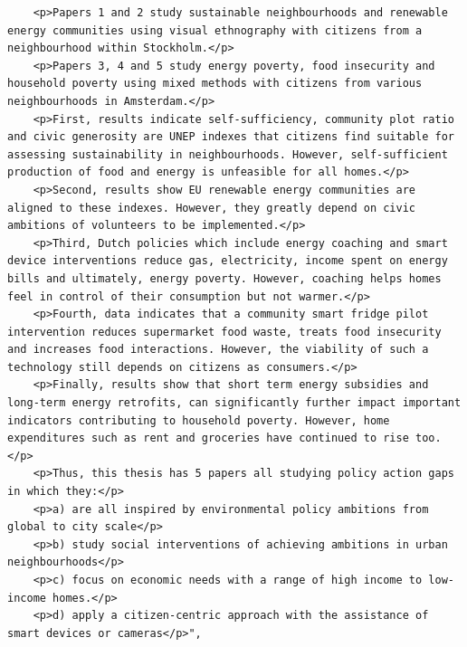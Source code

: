 \begin{casestudySection}
\begin{lstlisting}
    <p>Papers 1 and 2 study sustainable neighbourhoods and renewable energy communities using visual ethnography with citizens from a neighbourhood within Stockholm.</p>
    <p>Papers 3, 4 and 5 study energy poverty, food insecurity and household poverty using mixed methods with citizens from various neighbourhoods in Amsterdam.</p>
    <p>First, results indicate self-sufficiency, community plot ratio and civic generosity are UNEP indexes that citizens find suitable for assessing sustainability in neighbourhoods. However, self-sufficient production of food and energy is unfeasible for all homes.</p>
    <p>Second, results show EU renewable energy communities are aligned to these indexes. However, they greatly depend on civic ambitions of volunteers to be implemented.</p>
    <p>Third, Dutch policies which include energy coaching and smart device interventions reduce gas, electricity, income spent on energy bills and ultimately, energy poverty. However, coaching helps homes feel in control of their consumption but not warmer.</p>
    <p>Fourth, data indicates that a community smart fridge pilot intervention reduces supermarket food waste, treats food insecurity and increases food interactions. However, the viability of such a technology still depends on citizens as consumers.</p>
    <p>Finally, results show that short term energy subsidies and long-term energy retrofits, can significantly further impact important indicators contributing to household poverty. However, home expenditures such as rent and groceries have continued to rise too.</p>
    <p>Thus, this thesis has 5 papers all studying policy action gaps in which they:</p>
    <p>a) are all inspired by environmental policy ambitions from global to city scale</p>
    <p>b) study social interventions of achieving ambitions in urban neighbourhoods</p>
    <p>c) focus on economic needs with a range of high income to low-income homes.</p>
    <p>d) apply a citizen-centric approach with the assistance of smart devices or cameras</p>",

\end{lstlisting}
\end{casestudySection}
